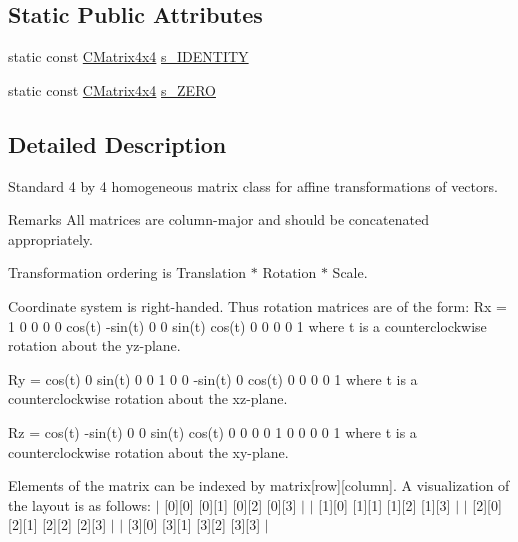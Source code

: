 \subsection*{Static Public Attributes}
\begin{DoxyCompactItemize}
\item 
static const \hyperlink{class_slim_1_1_c_matrix4x4}{C\+Matrix4x4} \hyperlink{class_slim_1_1_c_matrix4x4_adf215fa14b06548d37871d1a8e604e99}{s\+\_\+\+I\+D\+E\+N\+T\+I\+T\+Y}
\item 
static const \hyperlink{class_slim_1_1_c_matrix4x4}{C\+Matrix4x4} \hyperlink{class_slim_1_1_c_matrix4x4_a234226d5a92f3d8d26c73b6cb55d0721}{s\+\_\+\+Z\+E\+R\+O}
\end{DoxyCompactItemize}


\subsection{Detailed Description}
Standard 4 by 4 homogeneous matrix class for affine transformations of vectors. \begin{DoxyRemark}{Remarks}
All matrices are column-\/major and should be concatenated appropriately. 
\end{DoxyRemark}
\begin{DoxyParagraph}{}
Transformation ordering is Translation $\ast$ Rotation $\ast$ Scale. 
\end{DoxyParagraph}
\begin{DoxyParagraph}{}
Coordinate system is right-\/handed. Thus rotation matrices are of the form\+: Rx = 1 0 0 0 0 cos(t) -\/sin(t) 0 0 sin(t) cos(t) 0 0 0 0 1 where t is a counterclockwise rotation about the yz-\/plane. 
\end{DoxyParagraph}
\begin{DoxyParagraph}{}
Ry = cos(t) 0 sin(t) 0 0 1 0 0 -\/sin(t) 0 cos(t) 0 0 0 0 1 where t is a counterclockwise rotation about the xz-\/plane. 
\end{DoxyParagraph}
\begin{DoxyParagraph}{}
Rz = cos(t) -\/sin(t) 0 0 sin(t) cos(t) 0 0 0 0 1 0 0 0 0 1 where t is a counterclockwise rotation about the xy-\/plane. 
\end{DoxyParagraph}
\begin{DoxyParagraph}{}
Elements of the matrix can be indexed by matrix\mbox{[}row\mbox{]}\mbox{[}column\mbox{]}. A visualization of the layout is as follows\+: $\vert$ \mbox{[}0\mbox{]}\mbox{[}0\mbox{]} \mbox{[}0\mbox{]}\mbox{[}1\mbox{]} \mbox{[}0\mbox{]}\mbox{[}2\mbox{]} \mbox{[}0\mbox{]}\mbox{[}3\mbox{]} $\vert$ $\vert$ \mbox{[}1\mbox{]}\mbox{[}0\mbox{]} \mbox{[}1\mbox{]}\mbox{[}1\mbox{]} \mbox{[}1\mbox{]}\mbox{[}2\mbox{]} \mbox{[}1\mbox{]}\mbox{[}3\mbox{]} $\vert$ $\vert$ \mbox{[}2\mbox{]}\mbox{[}0\mbox{]} \mbox{[}2\mbox{]}\mbox{[}1\mbox{]} \mbox{[}2\mbox{]}\mbox{[}2\mbox{]} \mbox{[}2\mbox{]}\mbox{[}3\mbox{]} $\vert$ $\vert$ \mbox{[}3\mbox{]}\mbox{[}0\mbox{]} \mbox{[}3\mbox{]}\mbox{[}1\mbox{]} \mbox{[}3\mbox{]}\mbox{[}2\mbox{]} \mbox{[}3\mbox{]}\mbox{[}3\mbox{]} $\vert$ 
\end{DoxyParagraph}


